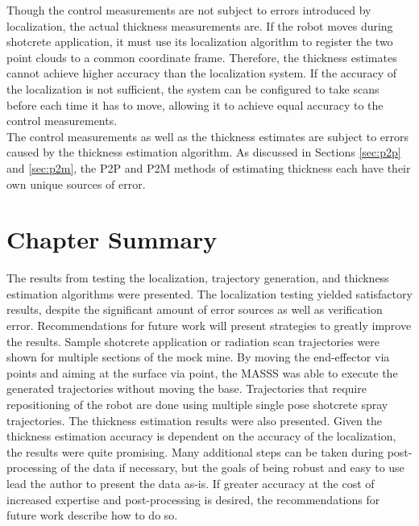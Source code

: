 Though the control measurements are not subject to errors introduced by localization, the actual thickness measurements are. If the robot moves during shotcrete application, it must use its localization algorithm to register the two point clouds to a common coordinate frame. Therefore, the thickness estimates cannot achieve higher accuracy than the localization system. If the accuracy of the localization is not sufficient, the system can be configured to take scans before each time it has to move, allowing it to achieve equal accuracy to the control measurements.\\

The control measurements as well as the thickness estimates are subject to errors caused by the thickness estimation algorithm. As discussed in Sections \ref{sec:p2p} and \ref{sec:p2m}, the P2P and P2M methods of estimating thickness each have their own unique sources of error.\\

\section{Chapter Summary}

The results from testing the localization, trajectory generation, and thickness estimation algorithms were presented. The localization testing yielded satisfactory results, despite the significant amount of error sources as well as verification error. Recommendations for future work will present strategies to greatly improve the results. Sample shotcrete application or radiation scan trajectories were shown for multiple sections of the mock mine. By moving the end-effector via points and aiming at the surface via point, the MASSS was able to execute the generated trajectories without moving the base. Trajectories that require repositioning of the robot are done using multiple single pose shotcrete spray trajectories. The thickness estimation results were also presented. Given the thickness estimation accuracy is dependent on the accuracy of the localization, the results were quite promising. Many additional steps can be taken during post-processing of the data if necessary, but the goals of being robust and easy to use lead the author to present the data as-is. If greater accuracy at the cost of increased expertise and post-processing is desired, the recommendations for future work describe how to do so.\\